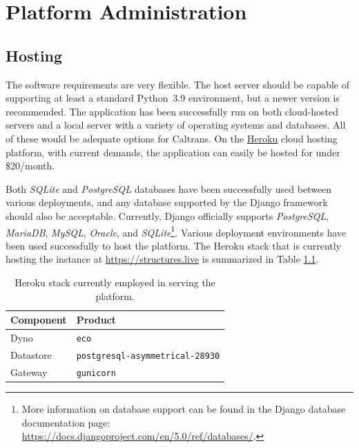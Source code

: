 \begingroup 


\chapter{Platform Administration}\label{sec:administration}



\section{Hosting}
The software requirements are very flexible. The host server should be capable of supporting at least a standard Python~3.9 environment, but a newer version is recommended. 
The application has been successfully run on both cloud-hosted servers and a local server with a variety of operating systems and databases. All of these would be adequate options for Caltrans. 
On the \href{https://www.heroku.com}{Heroku} cloud hosting platform, with current demands, the application can easily be hosted for under \$20/month.

Both \emph{SQLite} and \emph{PostgreSQL} databases have been successfully used between various deployments, and any database supported by the Django framework should also be acceptable. 
Currently, Django officially supports \emph{PostgreSQL}, \emph{MariaDB}, \emph{MySQL}, \emph{Oracle}, and \emph{SQLite}{\footnote{More information on database support can be found in the Django database documentation page:  \url{https://docs.djangoproject.com/en/5.0/ref/databases/}.}}. 
Various deployment environments have been used successfully to host the platform. The Heroku stack that is currently hosting the instance at \url{https://structures.live} is summarized in Table \ref{tab:heroku-stack}. 
\begin{table}[h!]
    \centering
    \caption{Heroku stack currently employed in serving the \BRACE{} platform.}
    \begin{tabular}{ll}
    \toprule
        \textbf{Component} & \textbf{Product} \\ \hline
         Dyno & \texttt{eco} \\
         Datastore &  \texttt{postgresql-asymmetrical-28930} \\
         Gateway & \texttt{gunicorn } \\
    \bottomrule
    \end{tabular}
    \label{tab:heroku-stack}
\end{table}


